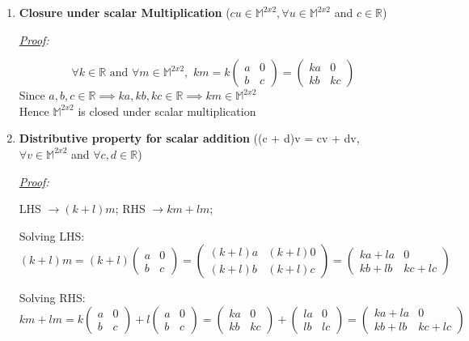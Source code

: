 \documentclass[12pt, letterpaper]{article}
\newcommand{\M}{\mathbb{M}^{2x2}}
\begin{document}
\begin{enumerate}
\item \textbf{Closure under scalar Multiplication}
  ($cu \in \M, \forall u \in \M$ and $c \in \mathbb{R}$)

\textit{\underline{Proof}:}

  \[
    \forall k \in \mathbb{R} \text{ and } \forall m \in \M, \,\,
    km = k\begin{pmatrix}a&0\\b&c\end{pmatrix}
    = \begin{pmatrix}ka&0\\kb&kc\end{pmatrix}
  \]
  Since $a, b, c \in \mathbb{R} \implies ka, kb, kc \in \mathbb{R} \implies \boxed{km \in \M}$
  \\Hence $\M$ is closed under scalar multiplication

\item \textbf{Distributive property for scalar addition}
  ((c + d)v = cv + dv, $\forall v \in \M$ and $\forall c,d \in \mathbb{R}$)

\textit{\underline{Proof}:}

  LHS $\to (k + l)m$; RHS $\to km + lm$;

  Solving LHS:
  \begin{equation}
  \label{1b6}
    (k + l)m
    = (k + l)\begin{pmatrix}a&0\\b&c\end{pmatrix}
    = \begin{pmatrix}(k + l)a&(k + l)0\\(k + l)b&(k + l)c\end{pmatrix}
    = \begin{pmatrix}ka + la&0\\kb + lb&kc + lc\end{pmatrix}
  \end{equation}

  Solving RHS:
  \begin{equation}
  \label{1b7}
    km + lm
    = k\begin{pmatrix}a&0\\b&c\end{pmatrix} + l\begin{pmatrix}a&0\\b&c\end{pmatrix}
    = \begin{pmatrix}ka&0\\kb&kc\end{pmatrix} + \begin{pmatrix}la&0\\lb&lc\end{pmatrix}
    = \begin{pmatrix}ka + la&0\\kb + lb&kc + lc\end{pmatrix}
  \end{equation}


\end{enumerate}
\end{document}
